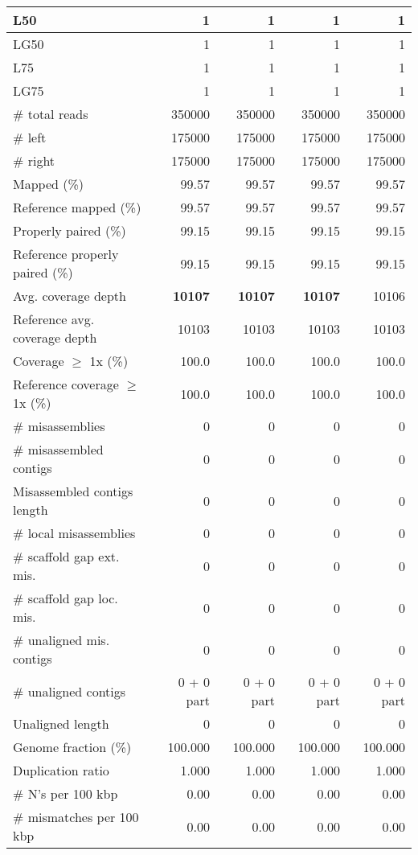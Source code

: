 \documentclass[12pt,a4paper]{article}
\begin{document}
\begin{table}[ht]
\begin{center}
\begin{tabular}{|l*{4}{|r}|}
L50 & 1 & 1 & 1 & 1 \\ \hline
LG50 & 1 & 1 & 1 & 1 \\ \hline
L75 & 1 & 1 & 1 & 1 \\ \hline
LG75 & 1 & 1 & 1 & 1 \\ \hline
\# total reads & 350000 & 350000 & 350000 & 350000 \\ \hline
\# left & 175000 & 175000 & 175000 & 175000 \\ \hline
\# right & 175000 & 175000 & 175000 & 175000 \\ \hline
Mapped (\%) & 99.57 & 99.57 & 99.57 & 99.57 \\ \hline
Reference mapped (\%) & 99.57 & 99.57 & 99.57 & 99.57 \\ \hline
Properly paired (\%) & 99.15 & 99.15 & 99.15 & 99.15 \\ \hline
Reference properly paired (\%) & 99.15 & 99.15 & 99.15 & 99.15 \\ \hline
Avg. coverage depth & {\bf 10107} & {\bf 10107} & {\bf 10107} & 10106 \\ \hline
Reference avg. coverage depth & 10103 & 10103 & 10103 & 10103 \\ \hline
Coverage $\geq$ 1x (\%) & 100.0 & 100.0 & 100.0 & 100.0 \\ \hline
Reference coverage $\geq$ 1x (\%) & 100.0 & 100.0 & 100.0 & 100.0 \\ \hline
\# misassemblies & 0 & 0 & 0 & 0 \\ \hline
\# misassembled contigs & 0 & 0 & 0 & 0 \\ \hline
Misassembled contigs length & 0 & 0 & 0 & 0 \\ \hline
\# local misassemblies & 0 & 0 & 0 & 0 \\ \hline
\# scaffold gap ext. mis. & 0 & 0 & 0 & 0 \\ \hline
\# scaffold gap loc. mis. & 0 & 0 & 0 & 0 \\ \hline
\# unaligned mis. contigs & 0 & 0 & 0 & 0 \\ \hline
\# unaligned contigs & 0 + 0 part & 0 + 0 part & 0 + 0 part & 0 + 0 part \\ \hline
Unaligned length & 0 & 0 & 0 & 0 \\ \hline
Genome fraction (\%) & 100.000 & 100.000 & 100.000 & 100.000 \\ \hline
Duplication ratio & 1.000 & 1.000 & 1.000 & 1.000 \\ \hline
\# N's per 100 kbp & 0.00 & 0.00 & 0.00 & 0.00 \\ \hline
\# mismatches per 100 kbp & 0.00 & 0.00 & 0.00 & 0.00 \\ \hline

\end{tabular}
\end{center}
\end{table}
\end{document}
